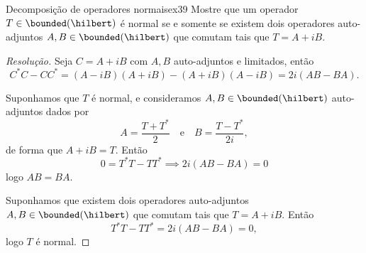 \begin{exercício}{Decomposição de operadores normais}{ex39}
    Mostre que um operador \(T \in \bounded(\hilbert)\) é normal se e somente se existem dois operadores auto-adjuntos \(A, B \in \bounded(\hilbert)\) que comutam tais que \(T = A + iB.\)
\end{exercício}
\begin{proof}[Resolução]
  Seja \(C = A + iB\) com \(A, B\) auto-adjuntos e limitados, então
  \begin{equation*}
      C^*C - CC^* = (A - iB)(A + iB) - (A + iB)(A - iB) = 2i(AB - BA).
  \end{equation*}

  Suponhamos que \(T\) é normal, e consideramos \(A, B \in \bounded(\hilbert)\) auto-adjuntos dados por
  \begin{equation*}
    A = \frac{T + T^*}{2}\quad\text{e}\quad B = \frac{T - T^*}{2i},
  \end{equation*}
  de forma que \(A + i B = T.\) Então
  \begin{equation*}
      0 = T^*T - TT^* \implies 2i(AB - BA) = 0
  \end{equation*}
  logo \(AB = BA.\)

  Suponhamos que existem dois operadores auto-adjuntos \(A, B \in \bounded(\hilbert)\) que comutam tais que \(T = A + iB.\) Então
  \begin{equation*}
      T^*T - TT^* = 2i(AB - BA) = 0,
  \end{equation*}
  logo \(T\) é normal.
\end{proof}
